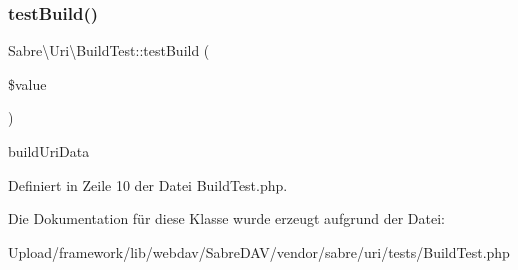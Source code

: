 \subsubsection{\texorpdfstring{test\+Build()}{testBuild()}}
{\footnotesize\ttfamily Sabre\textbackslash{}\+Uri\textbackslash{}\+Build\+Test\+::test\+Build (\begin{DoxyParamCaption}\item[{}]{\$value }\end{DoxyParamCaption})}

build\+Uri\+Data 

Definiert in Zeile 10 der Datei Build\+Test.\+php.



Die Dokumentation für diese Klasse wurde erzeugt aufgrund der Datei\+:\begin{DoxyCompactItemize}
\item 
Upload/framework/lib/webdav/\+Sabre\+D\+A\+V/vendor/sabre/uri/tests/Build\+Test.\+php\end{DoxyCompactItemize}
